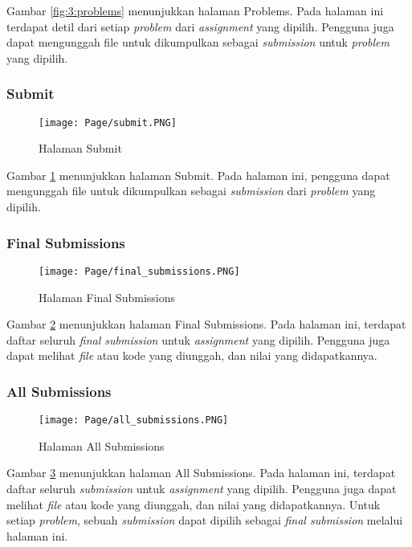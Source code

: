     Gambar \ref{fig:3:problems} menunjukkan halaman Problems. Pada halaman ini terdapat detil dari setiap \textit{problem} dari \textit{assignment} yang dipilih. Pengguna juga dapat mengunggah file untuk dikumpulkan sebagai \textit{submission} untuk \textit{problem} yang dipilih.
    
\subsubsection{Submit}
    \begin{figure}[H]
    	\centering  
    	\texttt{[image: Page/submit.PNG]}  
    	\caption{Halaman Submit}
    	\label{fig:3:submit} 
    \end{figure} 
    
    Gambar \ref{fig:3:submit} menunjukkan halaman Submit. Pada halaman ini, pengguna dapat mengunggah file untuk dikumpulkan sebagai \textit{submission} dari \textit{problem} yang dipilih.

\subsubsection{Final Submissions}
    \begin{figure}[H]
    	\centering  
    	\texttt{[image: Page/final\_submissions.PNG]}  
    	\caption{Halaman Final Submissions}
    	\label{fig:3:final_submissions} 
    \end{figure} 
    
    Gambar \ref{fig:3:final_submissions} menunjukkan halaman Final Submissions. Pada halaman ini, terdapat daftar seluruh \textit{final submission} untuk \textit{assignment} yang dipilih. Pengguna juga dapat melihat \textit{file} atau kode yang diunggah, dan nilai yang didapatkannya.
    
\subsubsection{All Submissions}
    \begin{figure}[H]
    	\centering  
    	\texttt{[image: Page/all\_submissions.PNG]}  
    	\caption{Halaman All Submissions}
    	\label{fig:3:all_submissions} 
    \end{figure} 
    
    Gambar \ref{fig:3:all_submissions} menunjukkan halaman All Submissions. Pada halaman ini, terdapat daftar seluruh \textit{submission} untuk \textit{assignment} yang dipilih. Pengguna juga dapat melihat \textit{file} atau kode yang diunggah, dan nilai yang didapatkannya. Untuk setiap \textit{problem}, sebuah \textit{submission} dapat dipilih sebagai \textit{final submission} melalui halaman ini.
    
